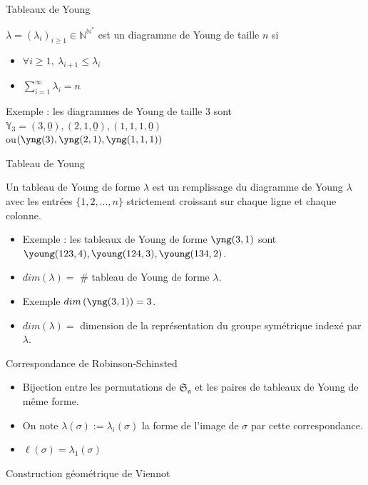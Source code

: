 \documentclass[french]{beamer}
\begin{document}
\begin{frame}{Tableaux de Young}
   \begin{definition}
   $\lambda=(\lambda_i)_{i\geq1} \in \mathbb{N}^{\mathbb{N}^*}$ est un diagramme de Young de taille $n$ si 
   \begin{itemize}
       \item $\forall i\geq1, \  \lambda_{i+1}\leq \lambda_i$
       \item $\sum_{i=1}^\infty \lambda_i=n$
   \end{itemize}
   \end{definition}
   Exemple : les diagrammes de Young de taille 3 sont $\mathbb{Y}_3=(3,\underline{0}),(2,1,\underline{0}),(1,1,1,\underline{0})$
   \\   ou$\left(\yng(3),\yng(2,1),\yng(1,1,1)\right)$
   
 
\end{frame}
\begin{frame}{Tableau de Young}
    \begin{definition}
    Un tableau de Young de forme $\lambda$ est un remplissage du diagramme de Young $\lambda$ avec les entrées $\{1,2,\dots,n\}$ strictement croissant sur chaque ligne et chaque colonne. 
    \end{definition}
    \begin{itemize}
        \item     Exemple : les tableaux de Young de forme $\yng(3,1)$ sont $\young(123,4),\young(124,3),\young(134,2)$. 
    \item$dim(\lambda)=$ \# tableau de Young de forme $\lambda$. 
    \item Exemple  $dim\left(\yng(3,1)\right)=3$.
    \item $dim(\lambda) = $   dimension de  la représentation du groupe symétrique indexé par $\lambda$.
    \end{itemize}
 \end{frame}


\begin{frame}{Correspondance de Robinson-Schinsted}
\begin{itemize}
    \item Bijection entre les permutations de $\mathfrak{S_n}$ et les paires de  tableaux de Young de même forme. 
    \item On note $\lambda(\sigma):=\lambda_i(\sigma)$ la forme de l'image de $\sigma$ par cette correspondance. 
    \item $\ell(\sigma)=\lambda_1(\sigma)$
\end{itemize}    
\end{frame}
\begin{frame}{Construction géométrique de Viennot}

\end{frame}
\end{document}
